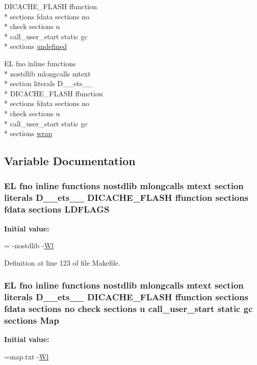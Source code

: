 \begin{DoxyCompactItemize}
D\-I\-C\-A\-C\-H\-E\-\_\-\-F\-L\-A\-S\-H ffunction \\*
sections fdata sections no \\*
check sections u \\*
call\-\_\-user\-\_\-start static gc \\*
sections \hyperlink{Makefile_a7caa220288c6621dffebfc3a50a851e1}{undefined}
\item 
E\-L fno inline functions \\*
nostdlib mlongcalls mtext \\*
section literals D\-\_\-\-\_\-ets\-\_\-\-\_\- \\*
D\-I\-C\-A\-C\-H\-E\-\_\-\-F\-L\-A\-S\-H ffunction \\*
sections fdata sections no \\*
check sections u \\*
call\-\_\-user\-\_\-start static gc \\*
sections \hyperlink{Makefile_a6b04d3dc9ff8a69521845b59ef6c33f1}{wrap}
\end{DoxyCompactItemize}


\subsection{Variable Documentation}
\hypertarget{Makefile_a0b0ec95cdd594ae63274ea3aa92e8bac}{
\subsubsection[{L\-D\-F\-L\-A\-G\-S}]{\setlength{\rightskip}{0pt plus 5cm}E\-L fno inline functions nostdlib mlongcalls mtext section literals D\-\_\-\-\_\-ets\-\_\-\-\_\- D\-I\-C\-A\-C\-H\-E\-\_\-\-F\-L\-A\-S\-H ffunction sections fdata sections L\-D\-F\-L\-A\-G\-S}}\label{Makefile_a0b0ec95cdd594ae63274ea3aa92e8bac}
{\bfseries Initial value\-:}
\begin{DoxyCode}
= -nostdlib 
    -\hyperlink{Makefile_a1af3a6ecef406b93f1a1db145b2cfd43}{Wl}
\end{DoxyCode}


Definition at line 123 of file Makefile.

\hypertarget{Makefile_a3d2682475b097eef42d87fa20f765794}{
\subsubsection[{Map}]{\setlength{\rightskip}{0pt plus 5cm}E\-L fno inline functions nostdlib mlongcalls mtext section literals D\-\_\-\-\_\-ets\-\_\-\-\_\- D\-I\-C\-A\-C\-H\-E\-\_\-\-F\-L\-A\-S\-H ffunction sections fdata sections no check sections u call\-\_\-user\-\_\-start static gc sections Map\hspace{0.3cm}{\ttfamily [static]}}}\label{Makefile_a3d2682475b097eef42d87fa20f765794}
{\bfseries Initial value\-:}
\begin{DoxyCode}
=map.txt  
    -\hyperlink{Makefile_a1af3a6ecef406b93f1a1db145b2cfd43}{Wl}
\end{DoxyCode}


